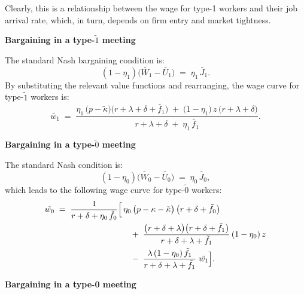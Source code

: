 \documentclass[12pt]{article} %
\theoremstyle{definition}
\begin{document}
Clearly, this is a relationship between the wage for type-1 workers and their job arrival rate, which, in turn, depends on firm entry and market tightness. 

\bigskip 
\noindent \textbf{Bargaining in a type-$\tilde{1}$ meeting}

\medskip

\noindent The standard Nash bargaining condition is:
\begin{equation}
(1-\eta_1)\bigl(\tilde{W_1} - \tilde{U_1}\bigr) \;=\; \eta_1 \,\tilde{J_1}.
\label{eq bargain 1_tilde_mod}
\end{equation}
By substituting the relevant value functions and rearranging, the wage curve for type-$\tilde{1}$ workers is:
\begin{equation}
\tilde{w_1} 
\;=\; \frac{\eta_1 \,\bigl(p - \tilde{\kappa}\bigr)\bigl(r+\lambda+\delta+\tilde{f_1}\bigr)
\;+\;\bigl(1-\eta_1\bigr)\,z\,\bigl(r+\lambda+\delta\bigr)}
{r+\lambda+\delta\;+\;\eta_1\,\tilde{f_1}}.
\label{eq WC 1_tilde_mod}
\end{equation}
\bigskip 

\noindent \textbf{Bargaining in a type-$\tilde{0}$ meeting}

\medskip

\noindent The standard Nash condition is:
\[
(1-\eta_0)\bigl(\tilde{W_0} - \tilde{U_0}\bigr) \;=\; \eta_0 \,\tilde{J_0},
\]
which leads to the following wage curve for type-$\tilde{0}$ workers:
\begin{equation} 
\label{eq WC0_tilde_mod}
\begin{split}
\tilde{w_0} \;=\; \frac{1}{r+\delta+\eta_0 \,\tilde{f_0}}
\Bigl[
&\,\eta_0\,\bigl(p-\kappa-\tilde{\kappa}\bigr)\,\bigl(r+\delta+\tilde{f_0}\bigr) \\
&\quad+\;\frac{\bigl(r+\delta+\lambda\bigr)\bigl(r+\delta+\tilde{f_1}\bigr)}{r+\delta+\lambda+\tilde{f_1}}\,(1-\eta_0)\,z \\
&\quad-\;\frac{\lambda\,(1-\eta_0)\,\tilde{f_1}}{r+\delta+\lambda+\tilde{f_1}}\;\tilde{w_1}
\Bigr].
\end{split}
\end{equation}

\bigskip

\noindent \textbf{Bargaining in a type-0 meeting}

\medskip
\end{document}
